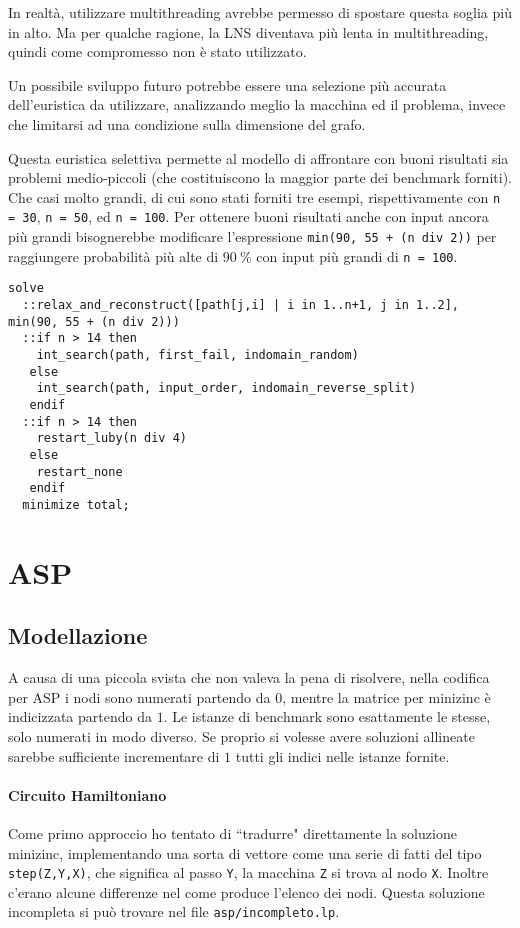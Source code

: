 \documentclass[11pt, a4paper]{article}
\begin{document}
In realtà, utilizzare multithreading avrebbe permesso di spostare questa soglia più in alto. Ma per qualche ragione, la LNS diventava più lenta in multithreading, quindi come compromesso non è stato utilizzato.

Un possibile sviluppo futuro potrebbe essere una selezione più accurata dell'euristica da utilizzare, analizzando meglio la macchina ed il problema, invece che limitarsi ad una condizione sulla dimensione del grafo.

Questa euristica selettiva permette al modello di affrontare con buoni risultati sia problemi medio-piccoli (che costituiscono la maggior parte dei benchmark forniti). Che casi molto grandi, di cui sono stati forniti tre esempi, rispettivamente con \lstinline{n = 30}, \lstinline{n = 50}, ed \lstinline{n = 100}.
Per ottenere buoni risultati anche con input ancora più grandi bisognerebbe modificare l'espressione \lstinline{min(90, 55 + (n div 2))} per raggiungere probabilità più alte di $\qty{90}{\percent}$ con input più grandi di \lstinline{n = 100}.

\begin{lstlisting}[language=minizinc]
solve 
  ::relax_and_reconstruct([path[j,i] | i in 1..n+1, j in 1..2], min(90, 55 + (n div 2)))
  ::if n > 14 then 
    int_search(path, first_fail, indomain_random) 
   else 
    int_search(path, input_order, indomain_reverse_split) 
   endif
  ::if n > 14 then
    restart_luby(n div 4) 
   else 
    restart_none
   endif
  minimize total;
\end{lstlisting}

\section{ASP}

\subsection{Modellazione}

A causa di una piccola svista che non valeva la pena di risolvere, nella codifica per ASP i nodi sono numerati partendo da $0$, mentre la matrice per minizinc è indicizzata partendo da $1$.
Le istanze di benchmark sono esattamente le stesse, solo numerati in modo diverso.
Se proprio si volesse avere soluzioni allineate sarebbe sufficiente incrementare di $1$ tutti gli indici nelle istanze fornite.

\paragraph{Circuito Hamiltoniano}
Come primo approccio ho tentato di ``tradurre" direttamente la soluzione minizinc, implementando una sorta di vettore come una serie di fatti del tipo \lstinline{step(Z,Y,X)}, che significa al passo \lstinline{Y}, la macchina \lstinline{Z} si trova al nodo \lstinline{X}.
Inoltre c'erano alcune differenze nel come produce l'elenco dei nodi.
Questa soluzione incompleta si può trovare nel file \lstinline{asp/incompleto.lp}.
\end{document}
